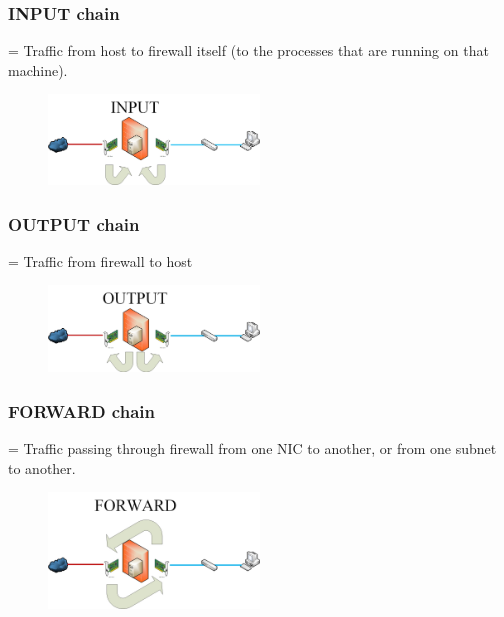 \documentclass{article}
\begin{document}
\subsubsection{INPUT chain}

= Traffic from host to firewall itself (to the processes that are running on that machine).

\begin{figure}[H]
    \centering
    \includegraphics[width=0.5\textwidth]{input-chain.jpg}
\end{figure}

\subsubsection{OUTPUT chain}

= Traffic from firewall to host

\begin{figure}[H]
    \centering
    \includegraphics[width=0.5\textwidth]{output-chain.jpg}
\end{figure}

\subsubsection{FORWARD chain}

= Traffic passing through firewall from one NIC to another, or from one subnet to another.

\begin{figure}[H]
    \centering
    \includegraphics[width=0.5\textwidth]{forward-chain.jpg}
\end{figure}
\end{document}
